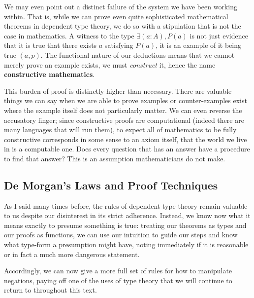 \documentclass[11pt]{article}
\begin{document}
We may even point out a distinct failure of the system we have been working within. That is, while we can prove even quite sophisticated mathematical theorems in dependent type theory, we do so with a stipulation that is not the case in mathematics. A witness to the type $\exists (a : A), P(a)$ is not just evidence that it is true that there exists $a$ satisfying $P(a)$, it is an example of it being true $(a,p)$. The functional nature of our deductions means that we cannot merely prove an example exists, we must \emph{construct} it, hence the name \textbf{constructive mathematics}.

This burden of proof is distinctly higher than necessary. There are valuable things we can say when we are able to prove examples or counter-examples exist where the example itself does not particularly matter. We can even reverse the accusatory finger; since constructive proofs are computational (indeed there are many languages that will run them), to expect all of mathematics to be fully constructive corresponds in some sense to an axiom itself, that the world we live in is a computable one. Does every question that has an answer have a procedure to find that answer? This is an assumption mathematicians do not make.

\subsection{De Morgan's Laws and Proof Techniques}

As I said many times before, the rules of dependent type theory remain valuable to us despite our disinterest in its strict adherence. Instead, we know now what it means exactly to presume something is true: treating our theorems as types and our proofs as functions, we can use our intuition to guide our steps and know what type-form a presumption might have, noting immediately if it is reasonable or in fact a much more dangerous statement.

Accordingly, we can now give a more full set of rules for how to manipulate negations, paying off one of the uses of type theory that we will continue to return to throughout this text.
\end{document}
